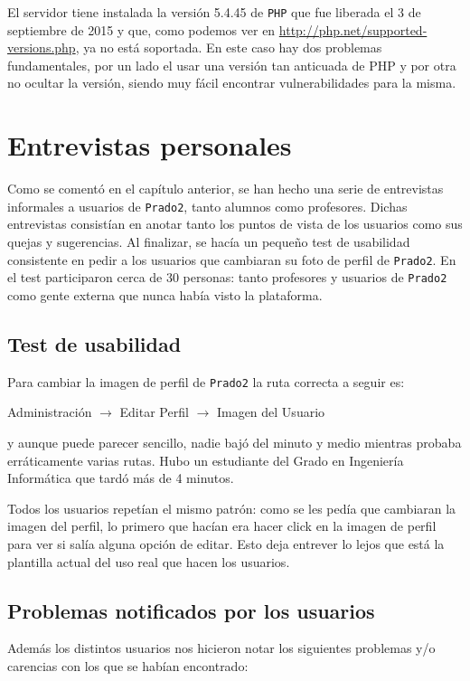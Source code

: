 \bigskip
El servidor tiene instalada la versión 5.4.45 de \texttt{PHP} que fue liberada el 3 de septiembre de 2015 y que, como podemos ver en \url{http://php.net/supported-versions.php}, ya no está soportada. En este caso hay dos problemas fundamentales, por un lado el usar una versión tan anticuada de PHP y por otra no ocultar la versión, siendo muy fácil encontrar vulnerabilidades para la misma.

\section{Entrevistas personales}

Como se comentó en el capítulo anterior, se han hecho una serie de entrevistas informales a usuarios de \texttt{Prado2}, tanto alumnos como profesores. Dichas entrevistas consistían en anotar tanto los puntos de vista de los usuarios como sus quejas y sugerencias. Al finalizar, se hacía un pequeño test de usabilidad consistente en pedir a los usuarios que cambiaran su foto de perfil de \texttt{Prado2}. En el test participaron cerca de 30 personas: tanto profesores y usuarios de \texttt{Prado2} como gente externa que nunca había visto la plataforma.

\subsection{Test de usabilidad}

Para cambiar la imagen de perfil de \texttt{Prado2} la ruta correcta a seguir es:

\begin{center}
Administración $\rightarrow$ Editar Perfil $\rightarrow$ Imagen del Usuario
\end{center}

y aunque puede parecer sencillo, nadie bajó del minuto y medio mientras probaba erráticamente varias rutas. Hubo un estudiante del Grado en Ingeniería Informática que tardó más de 4 minutos.

\bigskip
Todos los usuarios repetían el mismo patrón: como se les pedía que cambiaran la imagen del perfil, lo primero que hacían era hacer click en la imagen de perfil para ver si salía alguna opción de editar. Esto deja entrever lo lejos que está la plantilla actual del uso real que hacen los usuarios.

\subsection{Problemas notificados por los usuarios}
Además los distintos usuarios nos hicieron notar los siguientes problemas y/o carencias con los que se habían encontrado:

